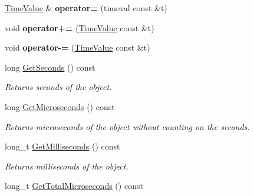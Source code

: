 \begin{DoxyCompactItemize}
\item 
\hypertarget{class_common_1_1_time_value_ae507f82f36c4cdac33c8febbecc60282}{\hyperlink{class_common_1_1_time_value}{Time\-Value} \& {\bfseries operator=} (timeval const \&t)}\label{class_common_1_1_time_value_ae507f82f36c4cdac33c8febbecc60282}

\item 
\hypertarget{class_common_1_1_time_value_a7c80df31b92e703d95fb48549058436d}{void {\bfseries operator+=} (\hyperlink{class_common_1_1_time_value}{Time\-Value} const \&t)}\label{class_common_1_1_time_value_a7c80df31b92e703d95fb48549058436d}

\item 
\hypertarget{class_common_1_1_time_value_ae7c09ef7194780501a7b61e86a9e67af}{void {\bfseries operator-\/=} (\hyperlink{class_common_1_1_time_value}{Time\-Value} const \&t)}\label{class_common_1_1_time_value_ae7c09ef7194780501a7b61e86a9e67af}

\item 
\hypertarget{class_common_1_1_time_value_a3e2c72628c93f93771e09c3bfa0e0576}{long \hyperlink{class_common_1_1_time_value_a3e2c72628c93f93771e09c3bfa0e0576}{Get\-Seconds} () const }\label{class_common_1_1_time_value_a3e2c72628c93f93771e09c3bfa0e0576}

\begin{DoxyCompactList}\small\item\em Returns seconds of the object. \end{DoxyCompactList}\item 
\hypertarget{class_common_1_1_time_value_af00ccb1be5508c87c13d470c945f21ce}{long \hyperlink{class_common_1_1_time_value_af00ccb1be5508c87c13d470c945f21ce}{Get\-Microseconds} () const }\label{class_common_1_1_time_value_af00ccb1be5508c87c13d470c945f21ce}

\begin{DoxyCompactList}\small\item\em Returns microseconds of the object without counting on the seconds. \end{DoxyCompactList}\item 
\hypertarget{class_common_1_1_time_value_a39462abbaa179ed2877b93b21e962ae4}{long\-\_\-t \hyperlink{class_common_1_1_time_value_a39462abbaa179ed2877b93b21e962ae4}{Get\-Milliseconds} () const }\label{class_common_1_1_time_value_a39462abbaa179ed2877b93b21e962ae4}

\begin{DoxyCompactList}\small\item\em Returns milliseconds of the object. \end{DoxyCompactList}\item 
\hypertarget{class_common_1_1_time_value_a7a6074859ace662725d33da293566229}{long\-\_\-t \hyperlink{class_common_1_1_time_value_a7a6074859ace662725d33da293566229}{Get\-Total\-Microseconds} () const }\label{class_common_1_1_time_value_a7a6074859ace662725d33da293566229}


\end{DoxyCompactItemize}
